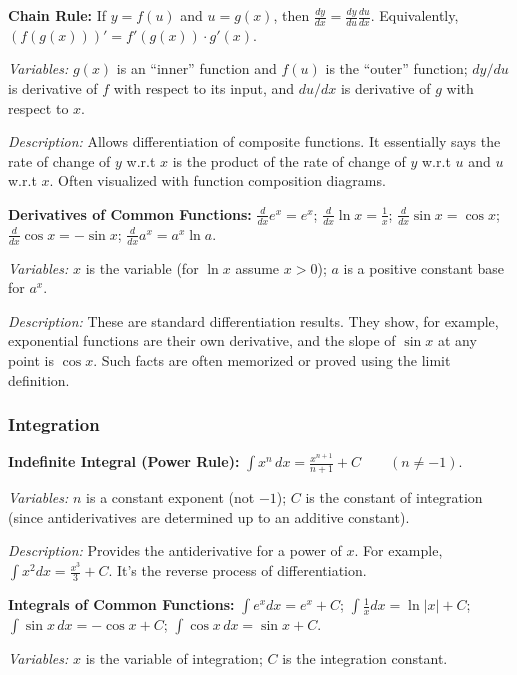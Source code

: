 \documentclass{article}
\begin{document}
\textbf{Chain Rule:} If $y = f(u)$ and $u = g(x)$, then $\displaystyle \frac{dy}{dx} = \frac{dy}{du}\frac{du}{dx}$. Equivalently, $(f(g(x)))' = f'(g(x))\cdot g'(x)$.

\textit{Variables:} $g(x)$ is an “inner” function and $f(u)$ is the “outer” function; $dy/du$ is derivative of $f$ with respect to its input, and $du/dx$ is derivative of $g$ with respect to $x$.

\textit{Description:} Allows differentiation of composite functions. It essentially says the rate of change of $y$ w.r.t $x$ is the product of the rate of change of $y$ w.r.t $u$ and $u$ w.r.t $x$. Often visualized with function composition diagrams.

\textbf{Derivatives of Common Functions:} $\frac{d}{dx}e^x = e^x$;  $\displaystyle \frac{d}{dx}\ln x = \frac{1}{x}$;  $\displaystyle \frac{d}{dx}\sin x = \cos x$;  $\displaystyle \frac{d}{dx}\cos x = -\sin x$;  $\displaystyle \frac{d}{dx}a^x = a^x \ln a$.

\textit{Variables:} $x$ is the variable (for $\ln x$ assume $x>0$); $a$ is a positive constant base for $a^x$.

\textit{Description:} These are standard differentiation results. They show, for example, exponential functions are their own derivative, and the slope of $\sin x$ at any point is $\cos x$. Such facts are often memorized or proved using the limit definition.

\subsubsection*{Integration}

\textbf{Indefinite Integral (Power Rule):} $\displaystyle \int x^n\,dx = \frac{x^{n+1}}{n+1} + C \qquad(n \neq -1)$.

\textit{Variables:} $n$ is a constant exponent (not $-1$); $C$ is the constant of integration (since antiderivatives are determined up to an additive constant).

\textit{Description:} Provides the antiderivative for a power of $x$. For example, $\int x^2 dx = \frac{x^3}{3}+C$. It’s the reverse process of differentiation.

\textbf{Integrals of Common Functions:} $\displaystyle \int e^x dx = e^x + C$;  $\displaystyle \int \frac{1}{x}dx = \ln|x| + C$;  $\displaystyle \int \sin x\,dx = -\cos x + C$;  $\displaystyle \int \cos x\,dx = \sin x + C$.

\textit{Variables:} $x$ is the variable of integration; $C$ is the integration constant.
\end{document}
